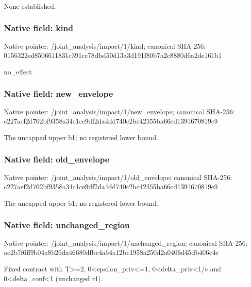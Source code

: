 \documentclass[10pt,a4paper]{article}
\begin{document}
\begingroup\raggedright\sloppy None established.\par\endgroup

\subsubsection{Native field: kind}
Native pointer: /joint\_\allowbreak{}analysis/impact/1/kind; canonical SHA-256: 0156322ed8506611831c391ce78dbd50d13a3d191f80b7a2c8880d6a2de161b1

\begingroup\raggedright\sloppy no\_\allowbreak{}effect\par\endgroup

\subsubsection{Native field: new\_\allowbreak{}envelope}
Native pointer: /joint\_\allowbreak{}analysis/impact/1/new\_\allowbreak{}envelope; canonical SHA-256: c227aef2d702bf9358a34c1ce9df2da4dd740c2bc42355ba66cd1391670819e9

\begingroup\raggedright\sloppy The uncapped upper b1;\allowbreak{} no registered lower bound.\par\endgroup

\subsubsection{Native field: old\_\allowbreak{}envelope}
Native pointer: /joint\_\allowbreak{}analysis/impact/1/old\_\allowbreak{}envelope; canonical SHA-256: c227aef2d702bf9358a34c1ce9df2da4dd740c2bc42355ba66cd1391670819e9

\begingroup\raggedright\sloppy The uncapped upper b1;\allowbreak{} no registered lower bound.\par\endgroup

\subsubsection{Native field: unchanged\_\allowbreak{}region}
Native pointer: /joint\_\allowbreak{}analysis/impact/1/unchanged\_\allowbreak{}region; canonical SHA-256: ae2b7f6ff9b04a8b26da46680dfbc4a64a12bc1958a250d2a0406d45db406c4c

\begingroup\raggedright\sloppy Fixed contract with T>=\allowbreak{}2,\allowbreak{} 0<epsilon\_\allowbreak{}priv<=\allowbreak{}1,\allowbreak{} 0<delta\_\allowbreak{}priv<1/\allowbreak{}e and 0<delta\_\allowbreak{}conf<1 (unchanged r1).\par\endgroup
\end{document}
